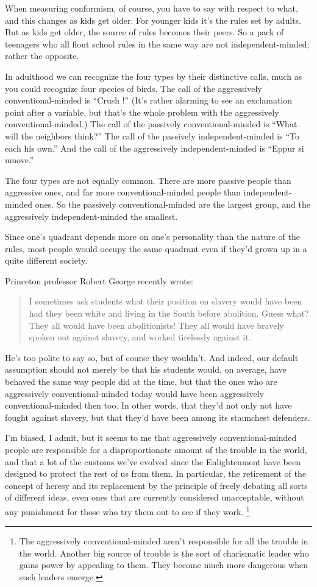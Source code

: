When measuring conformism, of course, you have to say with respect to
what, and this changes as kids get older. For younger kids it's the
rules set by adults. But as kids get older, the source of rules becomes
their peers. So a pack of teenagers who all flout school rules in the
same way are not independent-minded; rather the opposite.

In adulthood we can recognize the four types by their distinctive calls,
much as you could recognize four species of birds. The call of the
aggressively conventional-minded is ``Crush !'' (It's rather alarming to
see an exclamation point after a variable, but that's the whole problem
with the aggressively conventional-minded.) The call of the passively
conventional-minded is ``What will the neighbors think?'' The call of
the passively independent-minded is ``To each his own.'' And the call of
the aggressively independent-minded is ``Eppur si muove.''

The four types are not equally common. There are more passive people
than aggressive ones, and far more conventional-minded people than
independent-minded ones. So the passively conventional-minded are the
largest group, and the aggressively independent-minded the smallest.

Since one's quadrant depends more on one's personality than the nature
of the rules, most people would occupy the same quadrant even if they'd
grown up in a quite different society.

Princeton professor Robert George recently wrote:

\begin{quote}
I sometimes ask students what their position on slavery would have been
had they been white and living in the South before abolition. Guess
what? They all would have been abolitionists! They all would have
bravely spoken out against slavery, and worked tirelessly against it.
\end{quote}

He's too polite to say so, but of course they wouldn't. And indeed, our
default assumption should not merely be that his students would, on
average, have behaved the same way people did at the time, but that the
ones who are aggressively conventional-minded today would have been
aggressively conventional-minded then too. In other words, that they'd
not only not have fought against slavery, but that they'd have been
among its staunchest defenders.

I'm biased, I admit, but it seems to me that aggressively
conventional-minded people are responsible for a disproportionate amount
of the trouble in the world, and that a lot of the customs we've evolved
since the Enlightenment have been designed to protect the rest of us
from them. In particular, the retirement of the concept of heresy and
its replacement by the principle of freely debating all sorts of
different ideas, even ones that are currently considered unacceptable,
without any punishment for those who try them out to see if they work.
\footnote{The aggressively conventional-minded aren't responsible for all
the trouble in the world. Another big source of trouble is the sort of
charismatic leader who gains power by appealing to them. They become
much more dangerous when such leaders emerge.}

